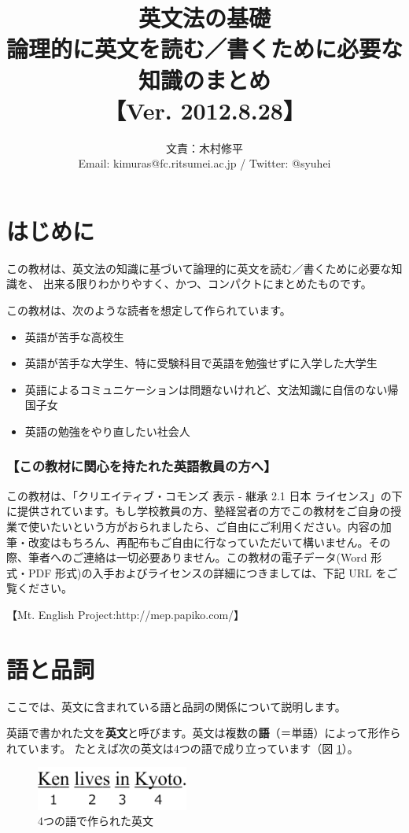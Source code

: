 \documentclass[12pt,titlepage]{jsarticle}
\title{英文法の基礎\\ 論理的に英文を読む／書くために必要な知識のまとめ\\【Ver. 2012.8.28】}
\author{文責：木村修平\\Email: kimuras@fc.ritsumei.ac.jp / Twitter: @syuhei}
\begin{document}
\maketitle
\tableofcontents

\newpage


\setcounter{section}{-1}
 \section{はじめに}
 この教材は、英文法の知識に基づいて論理的に英文を読む／書くために必要な知識を、
 出来る限りわかりやすく、かつ、コンパクトにまとめたものです。

 この教材は、次のような読者を想定して作られています。
 \begin{itemize}
  \item 英語が苦手な高校生
  \item 英語が苦手な大学生、特に受験科目で英語を勉強せずに入学した大学生
  \item 英語によるコミュニケーションは問題ないけれど、文法知識に自信のない帰国子女
  \item 英語の勉強をやり直したい社会人
 \end{itemize}

   \subsubsection*{【この教材に関心を持たれた英語教員の方へ】}
   この教材は、「クリエイティブ・コモンズ 表示 - 継承 2.1 日本 ライセンス」の下に提供されています。もし学校教員の方、塾経営者の方でこの教材をご自身の授業で使いたいという方がおられましたら、ご自由にご利用ください。内容の加筆・改変はもちろん、再配布もご自由に行なっていただいて構いません。その際、筆者へのご連絡は一切必要ありません。この教材の電子データ(Word 形式・PDF 形式)の入手およびライセンスの詳細につきましては、下記 URL をご覧ください。

【Mt. English Project:http://mep.papiko.com/】

 \section{語と品詞}
 ここでは、英文に含まれている語と品詞の関係について説明します。
 
 英語で書かれた文を{\bf 英文}と呼びます。英文は複数の{\bf 語}（＝単語）によって形作られています。
 たとえば次の英文は4つの語で成り立っています（図 \ref{fig1}）。

 
 \begin{figure}[htbp]
  \begin{center}
   \includegraphics[width=5cm]{./figure/fig1.pdf}
   \caption{4つの語で作られた英文}
   \label{fig1}
  \end{center}
 \end{figure}
 
\end{document}
